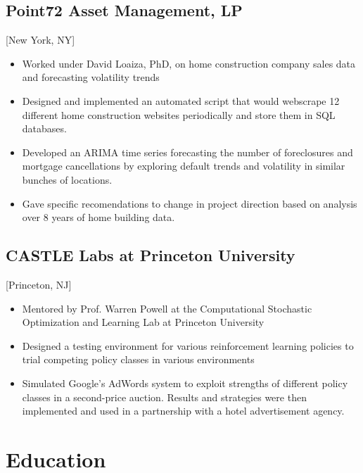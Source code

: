 \documentclass{rkim-resume}
\begin{document}
\subsection{Point72 Asset Management, LP}[New York, NY]
\begin{positions}
\end{positions}

\begin{itemize}
  \item Worked under David Loaiza, PhD, on home construction company sales data and forecasting volatility trends
  \item Designed and implemented an automated script that would webscrape 12 different home construction websites periodically and store them in SQL databases.
  \item Developed an ARIMA time series forecasting the number of foreclosures and mortgage cancellations by exploring default trends and volatility in similar bunches of locations.
  \item Gave specific recomendations to change in project direction based on analysis over 8 years of home building data.
\end{itemize}

\subsection{CASTLE Labs at Princeton University}[Princeton, NJ]
\begin{positions}
\end{positions}

\begin{itemize}
  \item Mentored by Prof. Warren Powell at the Computational Stochastic Optimization and Learning Lab at Princeton University
  \item Designed a testing environment for various reinforcement learning policies to trial competing policy classes in various environments 
  \item Simulated Google's AdWords system to exploit strengths of different policy classes in a second-price auction. Results and strategies were then implemented and used in a partnership with a hotel advertisement agency.
\end{itemize}

\section{Education}
\end{document}

